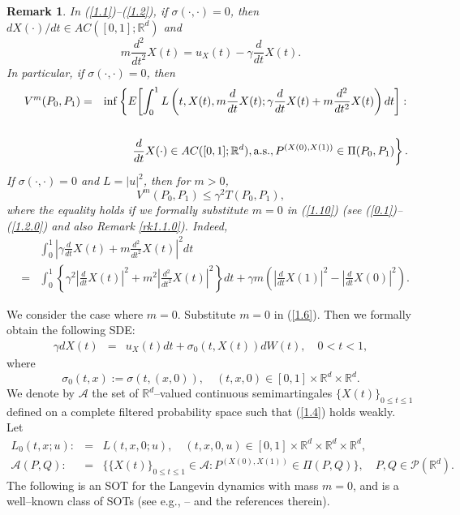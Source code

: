 \documentclass[12pt]{article}
\newtheorem{remark}{Remark}[section]
\begin{document}
\begin{remark}\label{rk1.3}
In (\ref{1.1})--(\ref{1.2}), if $\sigma(\cdot,\cdot)=0$,  then
$dX(\cdot)/dt\in AC([0,1];\mathbb{R}^d)$ and 
$$%
m\frac{d^2}{dt^2}X(t)=u_X(t)-\gamma \frac{d}{dt}X(t).$$
In particular,  if %
$\sigma(\cdot,\cdot)=0$, then 
\begin{eqnarray}
\quad V^m(P_0,P_1)
&=&\inf \left\{E\biggl[\int_0^1 L\left(t,X(t), m\frac{d}{dt}X(t);\gamma \frac{d}{dt}X(t)+m\frac{d^2}{dt^2}X(t)\right)dt \biggr]:\right.\nonumber\\
\label{1.10}\\
&&\qquad\left.\frac{d}{dt}X(\cdot)\in AC([0,1];\mathbb{R}^d), {\rm a.s.}, 
P^{(X(0), X(1))}\in \Pi(P_0,P_1)\right\}.\nonumber
\end{eqnarray}
If $\sigma(\cdot,\cdot)=0$ and $L=|u|^2$, then for $m>0$,
\begin{equation}
V^m(P_0,P_1)\le \gamma^2 T(P_0,P_1),
\end{equation}
where the equality holds if we formally substitute $m=0$ in (\ref{1.10}) (see (\ref{0.1})--(\ref{1.2.0}) and also Remark \ref{rk1.1.0}).
Indeed,
\begin{eqnarray*}
&&\int_0^1 \left|\gamma \frac{d}{dt}X(t)+m\frac{d^2}{dt^2}X(t)\right|^2dt\\
&=&\int_0^1 \left\{\gamma^2\left| \frac{d}{dt}X(t)\right|^2+m^2\left| \frac{d^2}{dt^2}X(t)\right|^2\right\}dt+
\gamma  m\left(\left| \frac{d}{dt}X(1)\right|^2-\left| \frac{d}{dt}X(0)\right|^2\right).
\end{eqnarray*}
\end{remark}




We consider the case where $m=0$.
Substitute $m=0$ in %
(\ref{1.6}).
Then we formally obtain the following SDE:
\begin{eqnarray}
\gamma dX(t)&=& u_X(t)dt+\sigma_0(t,X(t))dW(t),\quad 0< t<1,\label{1.4}%
\end{eqnarray}
where
$$\sigma_0(t,x):=\sigma (t,(x,0)), \quad (t,x,0)\in [0,1]\times \mathbb{R}^d\times \mathbb{R}^d.$$
We denote by $\mathcal{A}$ the set of $\mathbb{R}^{d}$--valued continuous semimartingales $\{X(t)\}_{0\le t\le 1}$ defined on a complete filtered probability space such that (\ref{1.4}) holds weakly.
Let 
\begin{eqnarray*}
L_0(t,x;u):&=&L(t,x,0;u), \quad (t,x,0,u)\in [0,1]\times \mathbb{R}^d \times\mathbb{R}^d \times \mathbb{R}^d,\\
\mathcal{A}(P,Q):&=&\{\{ X(t)\}_{0\le t\le 1}\in \mathcal{A}:P^{(X(0), X(1))}\in \Pi(P,Q)\},\quad P,Q\in \mathcal{P}(\mathbb{R}^d).
\end{eqnarray*}
The following is an SOT for the Langevin dynamics with mass $m=0$,
and is a well--known class of SOTs (see e.g., \cite{M08}--\cite{MT06} and the references therein).
\end{document}
